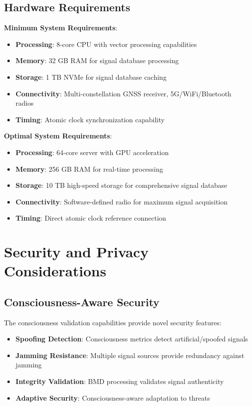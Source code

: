 \documentclass[12pt,a4paper]{article}
\begin{document}
\subsection{Hardware Requirements}

\textbf{Minimum System Requirements}:
\begin{itemize}
\item \textbf{Processing}: 8-core CPU with vector processing capabilities
\item \textbf{Memory}: 32 GB RAM for signal database processing
\item \textbf{Storage}: 1 TB NVMe for signal database caching
\item \textbf{Connectivity}: Multi-constellation GNSS receiver, 5G/WiFi/Bluetooth radios
\item \textbf{Timing}: Atomic clock synchronization capability
\end{itemize}

\textbf{Optimal System Requirements}:
\begin{itemize}
\item \textbf{Processing}: 64-core server with GPU acceleration
\item \textbf{Memory}: 256 GB RAM for real-time processing
\item \textbf{Storage}: 10 TB high-speed storage for comprehensive signal database
\item \textbf{Connectivity}: Software-defined radio for maximum signal acquisition
\item \textbf{Timing}: Direct atomic clock reference connection
\end{itemize}

\section{Security and Privacy Considerations}

\subsection{Consciousness-Aware Security}

The consciousness validation capabilities provide novel security features:

\begin{itemize}
\item \textbf{Spoofing Detection}: Consciousness metrics detect artificial/spoofed signals
\item \textbf{Jamming Resistance}: Multiple signal sources provide redundancy against jamming
\item \textbf{Integrity Validation}: BMD processing validates signal authenticity
\item \textbf{Adaptive Security}: Consciousness-aware adaptation to threats
\end{itemize}
\end{document}
